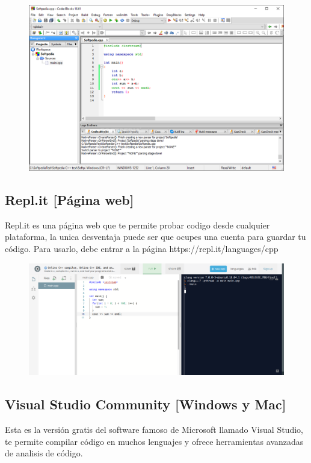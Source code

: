 \documentclass{article}
\begin{document}
\begin{figure}[H]
    \centering
    \includegraphics[width=0.5\paperwidth]{CodeBlocks}
\end{figure}

\subsection{Repl.it [Página web]}
Repl.it es una página web que te permite probar codigo desde cualquier plataforma, la unica desventaja puede ser que ocupes una cuenta para guardar tu código. Para usarlo, debe entrar a la página https://repl.it/languages/cpp

\begin{figure}[H]
    \centering
    \includegraphics[width=0.5\paperwidth]{replit}
\end{figure}

\subsection{Visual Studio Community [Windows y Mac]}
Esta es la versión gratis del software famoso de Microsoft llamado Visual Studio, te permite compilar código en muchos lenguajes y ofrece herramientas avanzadas de analisis de código.
\end{document}
